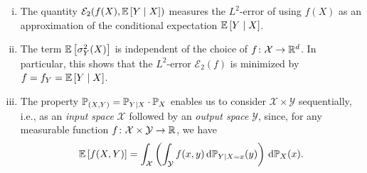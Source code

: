 \begin{remark}
\label{rmk: input-output}
\begin{enumerate}[(i)]
    \item The quantity $\mathcal{E}_2(f(X), \mathbb{E}\left[Y \mathrel{|} X\right])$ measures the $L^2$-error of using $f(X)$ as an approximation of the conditional expectation $\mathbb{E}\left[Y \mathrel{|} X\right]$.

    \item The term $\mathbb{E}\left[\sigma_Y^2(X)\right]$ is independent of the choice of $f \colon \mathcal{X} \to \mathbb{R}^d$. In particular, this shows that the $L^2$-error $\mathcal{E}_2(f)$ is minimized by $f = f_Y = \mathbb{E}\left[Y \mathrel{|} X\right]$.

    \item The property $\mathbb{P}_{(X, Y)} = \mathbb{P}_{Y \mathrel{|} X} \cdot \mathbb{P}_X$ enables us to consider $\mathcal{X} \times \mathcal{Y}$ sequentially, i.e., as an \emph{input space} $\mathcal{X}$ followed by an \emph{output space} $\mathcal{Y}$, since, for any measurable function $f \colon \mathcal{X} \times \mathcal{Y} \to \mathbb{R}$, we have
        \[
            \mathbb{E}\left[f(X, Y)\right] = \int_{\mathcal{X}} \left( \int_{\mathcal{Y}} f(x, y) \,\mathrm{d}\mathbb{P}_{Y \mathrel{|} X=x}(y) \right) \,\mathrm{d}\mathbb{P}_{X}(x).
        \]
\end{enumerate}
\end{remark}
